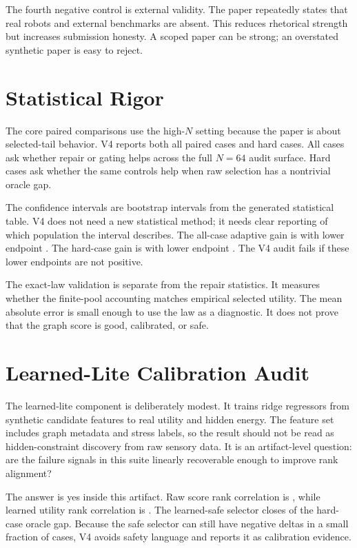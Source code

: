 \documentclass{article}
\begin{document}
The fourth negative control is external validity.  The paper repeatedly states
that real robots and external benchmarks are absent.  This reduces rhetorical
strength but increases submission honesty.  A scoped paper can be strong; an
overstated synthetic paper is easy to reject.

\section{Statistical Rigor}

The core paired comparisons use the high-\(N\) setting because the paper is
about selected-tail behavior.  V4 reports both all paired cases and hard cases.
All cases ask whether repair or gating helps across the full \(N=64\) audit
surface.  Hard cases ask whether the same controls help when raw selection has
a nontrivial oracle gap.

The confidence intervals are bootstrap intervals from the generated statistical
table.  V4 does not need a new statistical method; it needs clear reporting of
which population the interval describes.  The all-case adaptive gain is
\VFourGraphAllAdaptiveGain{} with lower endpoint \VFourGraphAllAdaptiveLow{}.
The hard-case gain is \VFourGraphHardAdaptiveGain{} with lower endpoint
\VFourGraphHardAdaptiveLow{}.  The V4 audit fails if these lower endpoints are
not positive.

The exact-law validation is separate from the repair statistics.  It measures
whether the finite-pool accounting matches empirical selected utility.  The
mean absolute error \VFourGraphExactError{} is small enough to use the law as
a diagnostic.  It does not prove that the graph score is good, calibrated, or
safe.

\section{Learned-Lite Calibration Audit}

The learned-lite component is deliberately modest.  It trains ridge regressors
from synthetic candidate features to real utility and hidden energy.  The
feature set includes graph metadata and stress labels, so the result should not
be read as hidden-constraint discovery from raw sensory data.  It is an
artifact-level question: are the failure signals in this suite linearly
recoverable enough to improve rank alignment?

The answer is yes inside this artifact.  Raw score rank correlation is
\VFourGraphRawRank{}, while learned utility rank correlation is
\VFourGraphLearnedRank{}.  The learned-safe selector closes
\VFourGraphSafeGapClosed{} of the hard-case oracle gap.  Because the safe
selector can still have negative deltas in a small fraction of cases, V4 avoids
safety language and reports it as calibration evidence.
\end{document}
